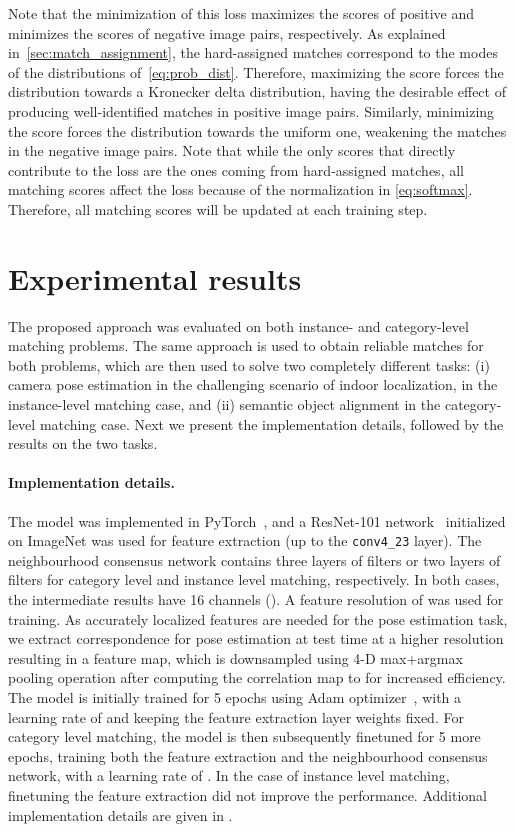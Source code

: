 \documentclass{article}
\begin{document}
Note that the minimization of this loss maximizes the scores of positive and minimizes the scores of negative image pairs, respectively. As explained in~\ref{sec:match_assignment}, the hard-assigned matches correspond to the modes of the distributions of~\eqref{eq:prob_dist}. Therefore, maximizing the score forces the distribution towards a Kronecker delta distribution, having the desirable effect of producing well-identified matches in positive image pairs. Similarly, minimizing the score forces the distribution towards the uniform one, weakening the matches in the negative image pairs. Note that while the only scores that directly contribute to the loss are the ones coming from hard-assigned matches, all matching scores affect the loss because of the normalization in \eqref{eq:softmax}. Therefore, all matching scores will be updated at each training step.


\section{Experimental results}
The proposed approach was evaluated on both instance- and category-level matching problems. The same approach is used to obtain reliable matches for both problems, which are then used to solve two completely different tasks: (i) camera pose estimation in the challenging scenario of indoor localization, in the instance-level matching case, and (ii) semantic object alignment in the category-level matching case. Next we present the implementation details, followed by the results on the two tasks. 

\paragraph{Implementation details.}
The model was implemented in PyTorch~\cite{pytorch}, and a ResNet-101 network~\cite{he2016deep} initialized on ImageNet was used for feature extraction (up to the \texttt{conv4\_23} layer). The neighbourhood consensus network  contains three layers of  filters or two layers of  filters for category level and instance level matching, respectively. In both cases, the intermediate results have 16 channels ().
A feature resolution of  was used for training. As accurately localized features are needed for the pose estimation task, we extract correspondence for pose estimation at test time at a higher resolution resulting in a  feature map, which is downsampled using 4-D max+argmax pooling operation after computing the correlation map to  for increased efficiency.
The model is initially trained for 5 epochs using Adam optimizer~\cite{kingma2015adam}, with a learning rate of  and keeping the feature extraction layer weights fixed. 
For category level matching, the model is then subsequently finetuned for 5 more epochs, training both the feature extraction and the neighbourhood consensus network, with a learning rate of . In the case of instance level matching, finetuning the feature extraction did not improve the performance. Additional implementation details are given in .
\end{document}
